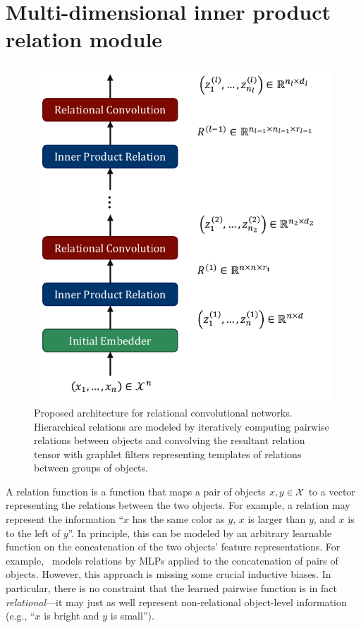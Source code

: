 \section{Multi-dimensional inner product relation module}\label{sec:mdipr}

\begin{figure}[t]
    \centering
    \includegraphics[width=.4\textwidth]{figs/relconv_architecture.pdf}
    \vskip-12pt
    \caption{Proposed architecture for relational convolutional networks. Hierarchical relations are modeled by iteratively computing pairwise relations between objects and convolving the resultant relation tensor with graphlet filters representing templates of relations between groups of objects.
    }\label{fig:relconv_architecture}
    \vskip-12pt
\end{figure}

A relation function is a function that maps a pair of objects $x, y \in {\mathcal{X}}$ to a vector representing the relations between the two objects. For example, a relation may represent the information ``$x$ has the same color as $y$, $x$ is larger than $y$, and $x$ is to the left of $y$''. In principle, this can be modeled by an arbitrary learnable function on the concatenation of the two objects' feature representations. For example,~\citet{santoroSimpleNeural2017} models relations by MLPs applied to the concatenation of pairs of objects. However, this approach is missing some crucial inductive biases. In particular, there is no constraint that the learned pairwise function is in fact \textit{relational}---it may just as well represent non-relational object-level information (e.g., ``$x$ is bright and $y$ is small'').%


